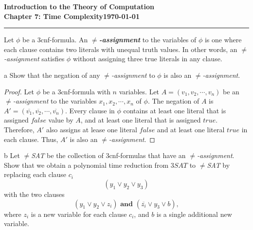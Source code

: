 \documentclass[11pt]{article}
\newcommand{\dated}{\today}
\begin{document}
\textbf{Introduction to the Theory of
Computation}\hfill\textbf{\myname}\\[0.01in]
\textbf{Chapter 7: Time Complexity}\hfill\textbf{\dated}\\
\smallskip\hrule\bigskip

\begin{problem}{7.26}
Let $\phi$ be a 3cnf-formula. An \textbf{$\neq$\textit{-assignment}} to the variables of $\phi$ is one where each clause contains two literals with unequal truth values. In other words, an $\neq$\textit{-assignment} satisfies $\phi$ without assigning three true literals in any clause.
\end{problem} 

\begin{problem}[Part]{a}
Show that the negation of any $\neq$\textit{-assignment} to $\phi$ is also an $\neq$\textit{-assignment}.
\end{problem}

\begin{proof}
Let $\phi$ be a 3cnf-formula with $n$ variables. Let $A = (v_1, v_2, \cdots, v_n)$ be an $\neq$\textit{-assignment} to the variables $x_1, x_2, \cdots, x_n$ of $\phi$. The negation of $A$ is $A' = (\overline{v_1}, \overline{v_2}, \cdots, \overline{v_n})$. Every clause in $\phi$ contains at least one literal that is assigned $false$ value by $A$, and at least one literal that is assigned $true$. Therefore, $A'$ also assigns at lease one literal $false$ and at least one literal $true$ in each clause. Thus, $A'$ is also an $\neq$\textit{-assignment}.
\end{proof}

\begin{problem}[Part]{b}
Let $\neq$\textit{SAT} be the collection of 3cnf-formulas that have an $\neq$\textit{-assignment}. Show that we obtain a polynomial time reduction from $3SAT$ to $\neq$\textit{SAT} by replacing each clause $c_i$
\[
(y_1 \vee y_2 \vee y_3)
\]
with the two clauses
\[
(y_1 \vee y_2 \vee z_i) \textbf{ and } (\overline{z_i} \vee y_3 \vee b),
\]
where $z_i$ is a new variable for each clause $c_i$, and $b$ is a single additional new variable.
\end{problem}
\end{document}
